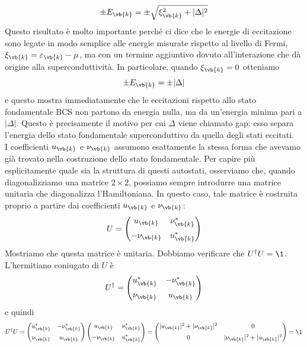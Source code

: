 \begin{equation*}
   \pm E_{\vb{k}}
   =
   \pm
   \sqrt{
      \xi_{\vb{k}}^2 + |\Delta|^2
   }
\end{equation*}
Questo risultato è molto importante perché ci dice che le energie di eccitazione sono legate in modo semplice alle energie misurate rispetto al livello di Fermi, $\xi_{\vb{k}}=\varepsilon_{\vb{k}}-\mu$, ma con un termine aggiuntivo dovuto all'interazione che dà origine alla superconduttività. In particolare, quando $\xi_{\vb{k}}=0$ otteniamo
\begin{equation*}
   \pm E_{\vb{k}}=\pm |\Delta|
\end{equation*}
e questo mostra immediatamente che le eccitazioni rispetto allo stato fondamentale BCS non partono da energia nulla, ma da un'energia minima pari a $|\Delta|$. Questo è precisamente il motivo per cui $\Delta$ viene chiamato gap: esso separa l'energia dello stato fondamentale superconduttivo da quella degli stati eccitati.\\
I coefficienti $u_{\vb{k}}$ e $\nu_{\vb{k}}$ assumono esattamente la stessa forma che avevamo già trovato nella costruzione dello stato fondamentale. Per capire più esplicitamente quale sia la struttura di questi autostati, osserviamo che, quando diagonalizziamo una matrice $2\times 2$, possiamo sempre introdurre una matrice unitaria che diagonalizza l'Hamiltoniana. In questo caso, tale matrice è costruita proprio a partire dai coefficienti $u_{\vb{k}}$ e $\nu_{\vb{k}}$:
\begin{equation*}
   U
   =
   \begin{pmatrix}
      u_{\vb{k}} & \nu^*_{\vb{k}}\\[0.2cm]
      -\nu_{\vb{k}} & u^*_{\vb{k}}
   \end{pmatrix}
\end{equation*}
Mostriamo che questa matrice è unitaria. Dobbiamo verificare che $U^{\dag}U=\1$. L'hermitiano coniugato di $U$ è
\begin{equation*}
   U^{\dag}
   =
   \begin{pmatrix}
      u^*_{\vb{k}} & -\nu^*_{\vb{k}}\\[0.2cm]
      \nu_{\vb{k}} & u_{\vb{k}}
   \end{pmatrix}
\end{equation*}
e quindi
\begin{equation*}
   U^{\dag} U
   =
   \begin{pmatrix}
      u^*_{\vb{k}} & -\nu^*_{\vb{k}}\\[0.2cm]
      \nu_{\vb{k}} & u_{\vb{k}}
   \end{pmatrix}
   \begin{pmatrix}
      u_{\vb{k}} & \nu^*_{\vb{k}}\\[0.2cm]
      -\nu_{\vb{k}} & u^*_{\vb{k}}
   \end{pmatrix}
   =
   \begin{pmatrix}
      |u_{\vb{k}}|^2 + |\nu_{\vb{k}}|^2 & 0\\[0.2cm]
      0 & |\nu_{\vb{k}}|^2 + |u_{\vb{k}}|^2
   \end{pmatrix}
   =
   \1
\end{equation*}
